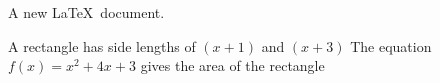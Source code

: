 \documentclass[11pt]{article}
\begin{document}
A new \LaTeX\ document.

A rectangle has side lengths of $(x+1)$ and $(x+3)$
The equation $f(x)=x^2+4x+3$ gives the area of the rectangle
\end{document}
